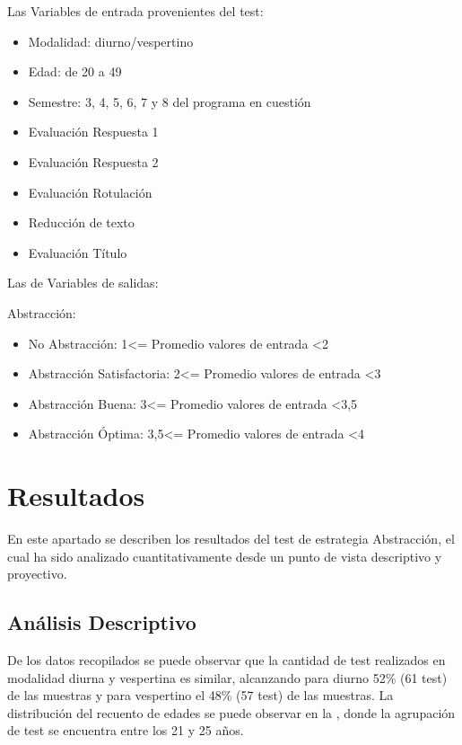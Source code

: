 \documentclass[spanish]{textolivre}
\begin{document}
Las Variables de entrada provenientes del test:

\begin{itemize}
\item Modalidad: diurno/vespertino
\item Edad: de 20 a 49
\item Semestre: 3, 4, 5, 6, 7 y 8 del programa en cuestión
\item Evaluación Respuesta 1  
\item Evaluación Respuesta 2
\item Evaluación Rotulación
\item Reducción de texto
\item Evaluación Título
\end{itemize}

Las de Variables de salidas:

Abstracción:

\begin{itemize}
\item No Abstracción: 1<= Promedio valores de entrada <2
\item Abstracción Satisfactoria: 2<= Promedio valores de entrada <3
\item Abstracción Buena: 3<= Promedio valores de entrada <3,5
\item Abstracción Óptima: 3,5<= Promedio valores de entrada <4
\end{itemize}


\section{Resultados}\label{result}
En este apartado se describen los resultados del test de estrategia Abstracción, el cual  ha sido analizado cuantitativamente desde un punto de vista descriptivo y proyectivo.

\subsection{Análisis Descriptivo}
De los datos recopilados se puede observar que la cantidad de test realizados en modalidad diurna y vespertina es similar, alcanzando para diurno 52\% (61 test) de las muestras y para vespertino el 48\% (57 test) de las muestras. La distribución del recuento de edades se puede observar en la , donde la agrupación de test se encuentra entre los 21 y 25 años.
\end{document}
